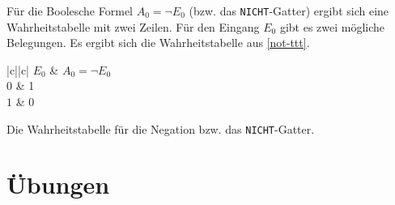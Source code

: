 Für die Boolesche Formel  $A_0=\neg E_0$ (bzw. das \texttt{NICHT}-Gatter) ergibt sich eine Wahrheitstabelle mit zwei Zeilen. Für den Eingang $E_0$ gibt es zwei mögliche Belegungen. Es ergibt sich die Wahrheitstabelle aus \autoref{not-ttt}.

\begin{table}[htb]
\centering
\begin{tblr}{|c||c|}
\hline
$E_0$ 	& $A_0 = \neg E_0$ \\ \hline[2pt]
$0$		& 1 \\ \hline
$1$		& 0 \\ \hline	
\end{tblr}
\caption{Die Wahrheitstabelle für die Negation bzw. das \texttt{NICHT}-Gatter.} 
\label{not-ttt}
\end{table}

\newpage

\section{Übungen}

